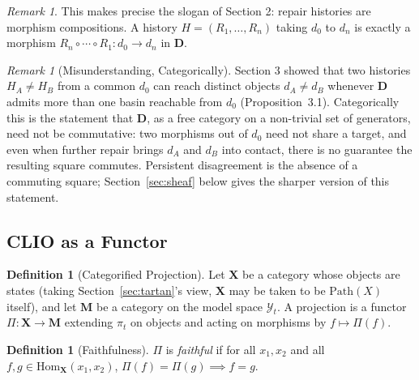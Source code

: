 \documentclass[11pt]{article}
\theoremstyle{plain}
\theoremstyle{definition}
\newtheorem{definition}[theorem]{Definition}
\theoremstyle{remark}
\newtheorem{remark}[theorem]{Remark}
\begin{document}
\begin{remark}
This makes precise the slogan of Section 2: repair histories are morphism compositions. A history $H = (R_1,\dots,R_n)$ taking $d_0$ to $d_n$ is exactly a morphism $R_n \circ \cdots \circ R_1 : d_0 \to d_n$ in $\mathbf{D}$.
\end{remark}

\begin{remark}[Misunderstanding, Categorically]
\label{rem:miscat}
Section 3 showed that two histories $H_A \ne H_B$ from a common $d_0$ can reach distinct objects $d_A \ne d_B$ whenever $\mathbf{D}$ admits more than one basin reachable from $d_0$ (Proposition~3.1). Categorically this is the statement that $\mathbf{D}$, as a free category on a non-trivial set of generators, need not be commutative: two morphisms out of $d_0$ need not share a target, and even when further repair brings $d_A$ and $d_B$ into contact, there is no guarantee the resulting square commutes. Persistent disagreement is the absence of a commuting square; Section~\ref{sec:sheaf} below gives the sharper version of this statement.
\end{remark}

\subsection{CLIO as a Functor}

\begin{definition}[Categorified Projection]
Let $\mathbf{X}$ be a category whose objects are states (taking Section~\ref{sec:tartan}'s view, $\mathbf{X}$ may be taken to be $\mathrm{Path}(X)$ itself), and let $\mathbf{M}$ be a category on the model space $\mathcal{Y}_t$. A projection is a functor $\Pi : \mathbf{X} \to \mathbf{M}$ extending $\pi_t$ on objects and acting on morphisms by $f \mapsto \Pi(f)$.
\end{definition}

\begin{definition}[Faithfulness]
$\Pi$ is \emph{faithful} if for all $x_1, x_2$ and all $f,g \in \mathrm{Hom}_{\mathbf X}(x_1,x_2)$, $\Pi(f) = \Pi(g) \implies f = g$.
\end{definition}
\end{document}
